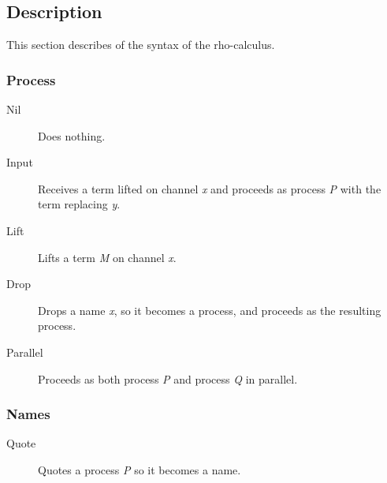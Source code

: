 \subsection{Description}
This section describes of the syntax of the rho-calculus.

\subsubsection{Process}
\begin{description}
\item[Nil] Does nothing.
\item[Input] Receives a term lifted on channel \textit{x} and proceeds as process \textit{P} with the term replacing \textit{y}.
\item[Lift] Lifts a term \textit{M} on channel \textit{x}.
\item[Drop] Drops a name \textit{x}, so it becomes a process, and proceeds as the resulting process.
\item[Parallel] Proceeds as both process \textit{P} and process \textit{Q} in parallel.
\end{description}


\subsubsection{Names}
\begin{description}
\item[Quote] Quotes a process \textit{P} so it becomes a name.
\end{description}


